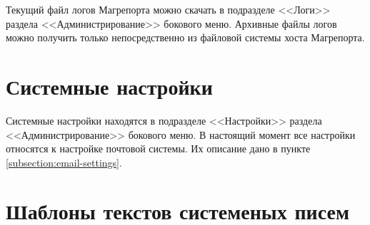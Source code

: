 \documentclass[../user-manual.tex]{subfiles}
\begin{document}
	Текущий файл логов Магрепорта можно скачать в подразделе <<Логи>> раздела <<Администрирование>> бокового меню. Архивные файлы логов можно получить только непосредственно из файловой системы хоста Магрепорта.
	
	\section{Системные настройки}
	
	Системные настройки находятся в подразделе <<Настройки>> раздела <<Администрирование>> бокового меню. В настоящий момент все настройки относятся к настройке почтовой системы. Их описание дано в пункте \ref{subsection:email-settings}.
	
	\section{Шаблоны текстов системеных писем}\label{section:letters-templates}
	
\end{document}
